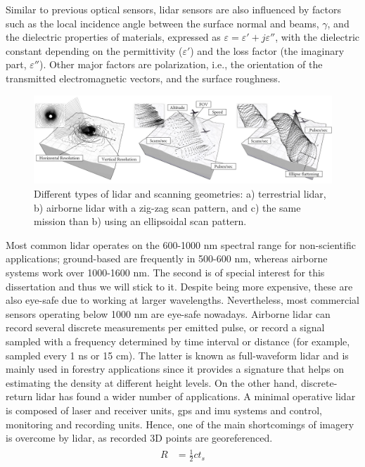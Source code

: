 Similar to previous optical sensors, \acrshort{lidar} sensors are also influenced by factors such as the local incidence angle between the surface normal and beams, $\gamma$, and the dielectric properties of materials, expressed as $\varepsilon = \varepsilon' + j\varepsilon''$, with the dielectric constant depending on the permittivity ($\varepsilon'$) and the loss factor (the imaginary part, $\varepsilon''$). Other major factors are polarization, i.e., the orientation of the transmitted electromagnetic vectors, and the surface roughness.

\begin{figure}[ht]
	\includegraphics[width=\linewidth]{figs/fundamentals/lidar_patterns.png}
	\caption{Different types of \acrshort{lidar} and scanning geometries: a) terrestrial \acrshort{lidar}, b) airborne \acrshort{lidar} with a zig-zag scan pattern, and c) the same mission than b) using an ellipsoidal scan pattern.  }
    \label{fig:lidar_patterns}
\end{figure}

Most common \acrshort{lidar} operates on the 600-1000 \si{\nano\meter} spectral range for non-scientific applications; ground-based are frequently in 500-600 \si{\nano\meter}, whereas airborne systems work over 1000-1600 \si{\nano\meter}. The second is of special interest for this dissertation and thus we will stick to it. Despite being more expensive, these are also eye-safe due to working at larger wavelengths. Nevertheless, most commercial sensors operating below 1000 \si{\nano\meter} are eye-safe nowadays. Airborne \acrshort{lidar} can record several discrete measurements per emitted pulse, or record a signal sampled with a frequency determined by time interval or distance (for example, sampled every 1 \si{\nano\second} or 15 \si{\centi\meter}). The latter is known as full-waveform \acrshort{lidar} and is mainly used in forestry applications since it provides a signature that helps on estimating the density at different height levels. On the other hand, discrete-return \acrshort{lidar} has found a wider number of applications. A minimal operative \acrshort{lidar} is composed of laser and receiver units, \acrshort{gps} and \acrshort{imu} systems and control, monitoring and recording units. Hence, one of the main shortcomings of imagery is overcome by \acrshort{lidar}, as recorded 3D points are georeferenced. 
\begin{gather}
    \label{eq:lidar_distance}
    \begin{aligned}
        R &= \frac{1}{2}ct_s
    \end{aligned}
\end{gather}

